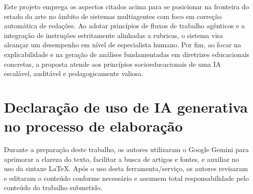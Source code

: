 \documentclass[12pt]{article}
\begin{document}
Este projeto emprega os aspectos citados acima para se posicionar na fronteira do estado da arte no âmbito de sistemas multiagentes com foco em correção automática de redações. Ao adotar princípios de fluxos de trabalho agênticos e a integração de instruções estritamente alinhadas a rubricas, o sistema visa alcançar um desempenho em nível de especialista humano. Por fim, ao focar na explicabilidade e na geração de análises fundamentadas em diretrizes educacionais concretas, a proposta atende aos princípios socioeducacionais de uma IA escalável, auditável e pedagogicamente valiosa.
\newpage

\section{Declaração de uso de IA generativa no processo de elaboração}
\label{sec:declaracao_uso_ia}

Durante a preparação deste trabalho, os autores utilizaram o Google Gemini para aprimorar a clareza do texto, facilitar a busca de artigos e fontes, e auxiliar no uso da sintaxe LaTeX. Após o uso desta ferramenta/serviço, os autores revisaram e editaram o conteúdo conforme necessário e assumem total responsabilidade pelo conteúdo do trabalho submetido.



\end{document}
